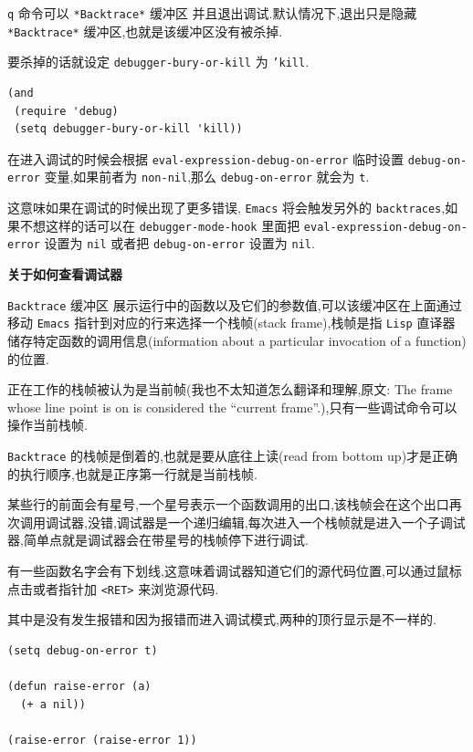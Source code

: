 \documentclass[11pt]{article}
\begin{document}
\begin{enumerate}
\texttt{q} 命令可以 \texttt{*Backtrace*} 缓冲区 并且退出调试.默认情况下,退出只是隐藏 \texttt{*Backtrace*} 缓冲区,也就是该缓冲区没有被杀掉.

要杀掉的话就设定 \texttt{debugger-bury-or-kill} 为 \texttt{'kill}.

\begin{verbatim}
(and
 (require 'debug)
 (setq debugger-bury-or-kill 'kill))
\end{verbatim}

在进入调试的时候会根据 \texttt{eval-expression-debug-on-error} 临时设置 \texttt{debug-on-error} 变量,如果前者为 \texttt{non-nil},那么 \texttt{debug-on-error} 就会为 \texttt{t}.

这意味如果在调试的时候出现了更多错误, \texttt{Emacs} 将会触发另外的 \texttt{backtraces},如果不想这样的话可以在 \texttt{debugger-mode-hook} 里面把 \texttt{eval-expression-debug-on-error} 设置为 \texttt{nil} 或者把 \texttt{debug-on-error} 设置为 \texttt{nil}.

\textbf{关于如何查看调试器}

\texttt{Backtrace} 缓冲区 展示运行中的函数以及它们的参数值,可以该缓冲区在上面通过移动 \texttt{Emacs} 指针到对应的行来选择一个栈帧(stack frame),栈帧是指 \texttt{Lisp} 直译器储存特定函数的调用信息(information about a particular invocation of a function)的位置.

正在工作的栈帧被认为是当前帧(我也不太知道怎么翻译和理解,原文: The frame whose line point is on is considered the “current frame”.),只有一些调试命令可以操作当前栈帧.

\texttt{Backtrace} 的栈帧是倒着的,也就是要从底往上读(read from bottom up)才是正确的执行顺序,也就是正序第一行就是当前栈帧.

某些行的前面会有星号,一个星号表示一个函数调用的出口,该栈帧会在这个出口再次调用调试器,没错,调试器是一个递归编辑,每次进入一个栈帧就是进入一个子调试器,简单点就是调试器会在带星号的栈帧停下进行调试.

有一些函数名字会有下划线,这意味着调试器知道它们的源代码位置,可以通过鼠标点击或者指针加 \texttt{<RET>} 来浏览源代码.

其中是没有发生报错和因为报错而进入调试模式,两种的顶行显示是不一样的.



\begin{verbatim}
(setq debug-on-error t)

(defun raise-error (a)
  (+ a nil))

(raise-error (raise-error 1))
\end{verbatim}


\end{enumerate}
\end{document}
